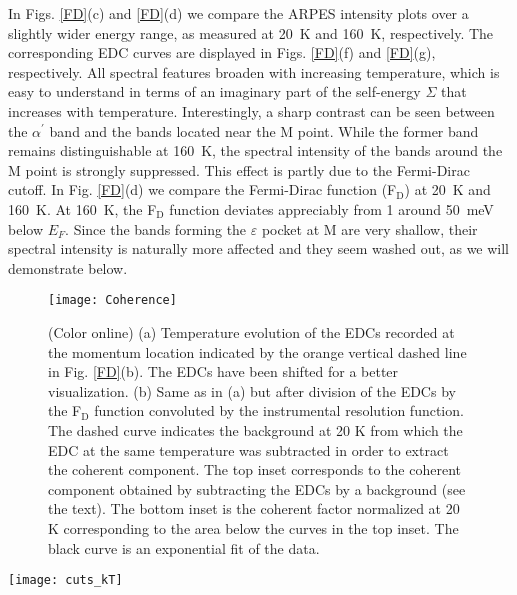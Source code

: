 \documentclass[twocolumn,aps,showpacs,preprintnumbers,amsmath,amssymb, superscriptaddress,longbibliography]{revtex4-1}
\begin{document}
In Figs. \ref{FD}(c) and \ref{FD}(d) we compare the ARPES intensity plots over a slightly wider energy range, as measured at 20~K and 160~K, respectively. The corresponding EDC curves are displayed in Figs. \ref{FD}(f) and \ref{FD}(g), respectively. All spectral features broaden with increasing temperature, which is easy to understand in terms of an imaginary part of the self-energy $\Sigma$ that increases with temperature. Interestingly, a sharp contrast can be seen between the $\alpha^{\prime}$ band and the bands located near the M point. While the former band remains distinguishable at 160~K, the spectral intensity of the bands around the M point is strongly suppressed. This effect is partly due to the Fermi-Dirac cutoff. In Fig. \ref{FD}(d) we compare the Fermi-Dirac function (F$_{\textrm{D}}$) at 20~K and 160~K. At 160~K, the F$_{\textrm{D}}$ function deviates appreciably from 1 around 50~meV below $E_F$. Since the bands forming the $\varepsilon$ pocket at M are very shallow, their spectral intensity is naturally more affected and they seem washed out, as we will demonstrate below.  

\begin{figure}[!t]
\begin{center}
\texttt{[image: Coherence]}
\end{center}
\caption{\label{Coherence}(Color online) (a) Temperature evolution of the EDCs recorded at the momentum location indicated by the orange vertical dashed line in Fig. \ref{FD}(b). The EDCs have been shifted for a better visualization. (b) Same as in (a) but after division of the EDCs by the F$_{\textrm{D}}$ function convoluted by the instrumental resolution function. The dashed curve indicates the background at 20 K from which the EDC at the same temperature was subtracted in order to extract the coherent component. The top inset corresponds to the coherent component obtained by subtracting the EDCs by a background (see the text). The bottom inset is the coherent factor normalized at 20 K corresponding to the area below the curves in the top inset. The black curve is an exponential fit of the data. }
\end{figure}

\begin{figure*}[!t]
\begin{center}
\texttt{[image: cuts\_kT]}
\end{center}
\caption{\label{Tcuts}(Color online) (a)-(j) ARPES intensity plots of KFe$_2$As$_2$ along the $\Gamma$-M direction, recorded at different temperatures. The color code is given in panel (f). All spectrum have been divided by the F$_{\textrm{D}}$ function convoluted with the instrumental resolution function. (k) Extracted band dispersion near $E_F$ for the bands forming the $\varepsilon$ pocket, recorded at different temperatures. (l) Same as (k) but for the $\alpha$ band.} 
\end{figure*}
\end{document}
